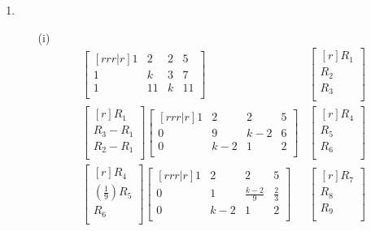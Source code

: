 \documentclass[12pt]{article}
\begin{document}
\begin{enumerate}
\begin{enumerate}
\begin{enumerate}
		\end{enumerate}	
		\medskip
	\item
	\medskip
		\begin{enumerate}
		\item [(i)]
		\begin{align*}
		\begin{bmatrix}[rrr|r]
		1 & 2 & 2 & 5\\
		1 & k & 3 & 7\\
		1 & 11 & k & 11\\
		\end{bmatrix}&
		\begin{bmatrix}[r]
		R_1\\ R_2\\ R_3\\
		\end{bmatrix}\\
		\begin{bmatrix}[r]
		R_1\\
		R_3 - R_1\\
		R_2 - R_1\\
		\end{bmatrix}
		\begin{bmatrix}[rrr|r]
		1 & 2 & 2 & 5\\
		0 & 9 & k-2 & 6\\
		0 & k-2 & 1 & 2\\
		\end{bmatrix}&
		\begin{bmatrix}[r]
		R_{4}\\ R_{5}\\ R_{6}\\
		\end{bmatrix}\\
		\begin{bmatrix}[r]
		R_4\\
		(\frac{1}{9})R_5\\
		R_6\\
		\end{bmatrix}
		\begin{bmatrix}[rrr|r]
		1 & 2 & 2 & 5\\
		0 & 1 & \frac{k-2}{9} & \frac{2}{3}\\
		0 & k-2 & 1 & 2\\		
		\end{bmatrix}&
		\begin{bmatrix}[r]
		R_{7}\\ R_{8}\\ R_{9}\\

\end{bmatrix}
\end{align*}
\end{enumerate}
\end{enumerate}
\end{enumerate}
\end{document}
